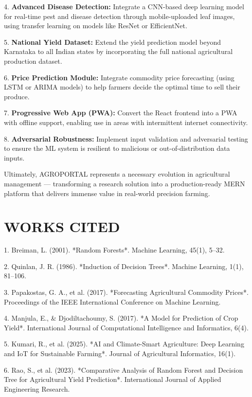 \documentclass[12pt,a4paper]{report}
\begin{document}
4. \textbf{Advanced Disease Detection:} Integrate a CNN-based deep learning model for real-time pest and disease detection through mobile-uploaded leaf images, using transfer learning on models like ResNet or EfficientNet.

5. \textbf{National Yield Dataset:} Extend the yield prediction model beyond Karnataka to all Indian states by incorporating the full national agricultural production dataset.

6. \textbf{Price Prediction Module:} Integrate commodity price forecasting (using LSTM or ARIMA models) to help farmers decide the optimal time to sell their produce.

7. \textbf{Progressive Web App (PWA):} Convert the React frontend into a PWA with offline support, enabling use in areas with intermittent internet connectivity.

8. \textbf{Adversarial Robustness:} Implement input validation and adversarial testing to ensure the ML system is resilient to malicious or out-of-distribution data inputs.

Ultimately, AGROPORTAL represents a necessary evolution in agricultural management — transforming a research solution into a production-ready MERN platform that delivers immense value in real-world precision farming.

\newpage

\section{WORKS CITED}

1. Breiman, L. (2001). *Random Forests*. Machine Learning, 45(1), 5–32.

2. Quinlan, J. R. (1986). *Induction of Decision Trees*. Machine Learning, 1(1), 81–106.

3. Papakostas, G. A., et al. (2017). *Forecasting Agricultural Commodity Prices*. Proceedings of the IEEE International Conference on Machine Learning.

4. Manjula, E., \& Djodiltachoumy, S. (2017). *A Model for Prediction of Crop Yield*. International Journal of Computational Intelligence and Informatics, 6(4).

5. Kumari, R., et al. (2025). *AI and Climate-Smart Agriculture: Deep Learning and IoT for Sustainable Farming*. Journal of Agricultural Informatics, 16(1).

6. Rao, S., et al. (2023). *Comparative Analysis of Random Forest and Decision Tree for Agricultural Yield Prediction*. International Journal of Applied Engineering Research.
\end{document}
